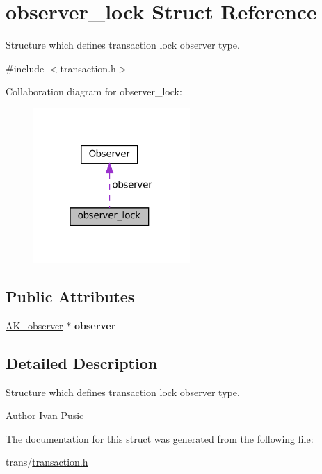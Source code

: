 \hypertarget{structobserver__lock}{}\section{observer\+\_\+lock Struct Reference}
\label{structobserver__lock}


Structure which defines transaction lock observer type.  




{\ttfamily \#include $<$transaction.\+h$>$}



Collaboration diagram for observer\+\_\+lock\+:\nopagebreak
\begin{figure}[H]
\begin{center}
\leavevmode
\includegraphics[width=169pt]{structobserver__lock__coll__graph}
\end{center}
\end{figure}
\subsection*{Public Attributes}
\begin{DoxyCompactItemize}
\item 
\mbox{\label{structobserver__lock_a50392f80cd7b7915056d44a49013f190}} 
\hyperlink{structObserver}{A\+K\+\_\+observer} $\ast$ {\bfseries observer}
\end{DoxyCompactItemize}


\subsection{Detailed Description}
Structure which defines transaction lock observer type. 

\begin{DoxyAuthor}{Author}
Ivan Pusic 
\end{DoxyAuthor}


The documentation for this struct was generated from the following file\+:\begin{DoxyCompactItemize}
\item 
trans/\hyperlink{transaction_8h}{transaction.\+h}\end{DoxyCompactItemize}
